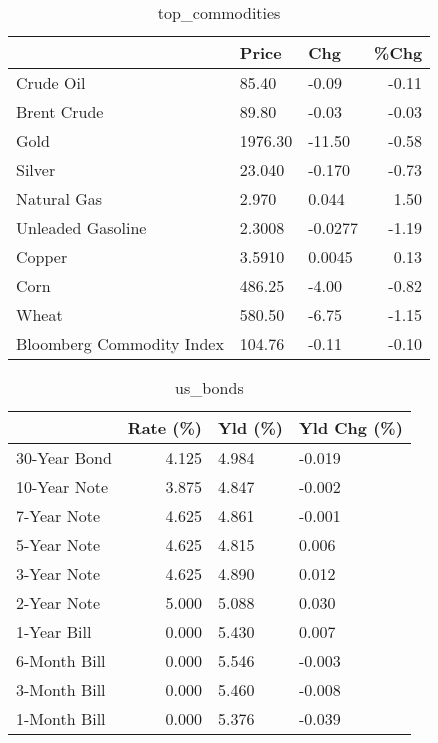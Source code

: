 \documentclass{article}%
\begin{document}
\begin{table}[htbp]%
\caption{top\_commodities}%
\centering%
\begin{adjustbox}{width=1\textwidth}%
\begin{tabular}{lllr}
\toprule
                          &   Price &     Chg &  \%Chg \\
\midrule
               Crude Oil  &   85.40 &   -0.09 & -0.11 \\
             Brent Crude  &   89.80 &   -0.03 & -0.03 \\
                    Gold  & 1976.30 &  -11.50 & -0.58 \\
                  Silver  &  23.040 &  -0.170 & -0.73 \\
             Natural Gas  &   2.970 &   0.044 &  1.50 \\
       Unleaded Gasoline  &  2.3008 & -0.0277 & -1.19 \\
                  Copper  &  3.5910 &  0.0045 &  0.13 \\
                    Corn  &  486.25 &   -4.00 & -0.82 \\
                   Wheat  &  580.50 &   -6.75 & -1.15 \\
Bloomberg Commodity Index &  104.76 &   -0.11 & -0.10 \\
\bottomrule
\end{tabular}
%
\end{adjustbox}%
\end{table}

%


\begin{table}[htbp]%
\caption{us\_bonds}%
\centering%
\begin{adjustbox}{width=1\textwidth}%
\begin{tabular}{lrll}
\toprule
             &  Rate (\%) & Yld (\%) & Yld Chg (\%) \\
\midrule
30-Year Bond &     4.125 &   4.984 &      -0.019 \\
10-Year Note &     3.875 &   4.847 &      -0.002 \\
 7-Year Note &     4.625 &   4.861 &      -0.001 \\
 5-Year Note &     4.625 &   4.815 &       0.006 \\
 3-Year Note &     4.625 &   4.890 &       0.012 \\
 2-Year Note &     5.000 &   5.088 &       0.030 \\
 1-Year Bill &     0.000 &   5.430 &       0.007 \\
6-Month Bill &     0.000 &   5.546 &      -0.003 \\
3-Month Bill &     0.000 &   5.460 &      -0.008 \\
1-Month Bill &     0.000 &   5.376 &      -0.039 \\
\bottomrule
\end{tabular}
%
\end{adjustbox}%
\end{table}
\end{document}
